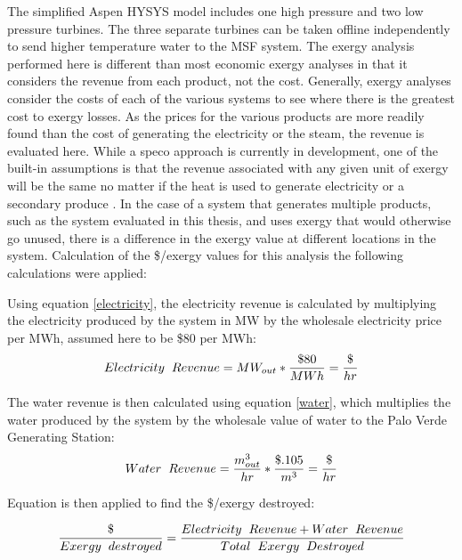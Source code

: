 The simplified Aspen HYSYS model includes one high pressure and two low pressure turbines.  The three separate turbines can be taken offline independently to send higher temperature water to the MSF system. The exergy analysis performed here is different than most economic exergy analyses in that it considers the revenue from each product, not the cost.  Generally, exergy analyses consider the costs of each of the various systems to see where there is the greatest cost to exergy losses.  As the prices for the various products are more readily found than the cost of generating the electricity or the steam, the revenue is evaluated here.  While a \ac{speco} approach is currently in development, one of the built-in assumptions is that the revenue associated with any given unit of exergy will be the same no matter if the heat is used to generate electricity or a secondary produce \cite{Paulus2006}.  In the case of a system that generates multiple products, such as the system evaluated in this thesis, and uses exergy that would otherwise go unused, there is a difference in the exergy value at different locations in the system. Calculation of the \$/exergy values for this analysis the following calculations were applied:

Using equation \ref{electricity}, the electricity revenue is calculated by multiplying the electricity produced by the system in MW by the wholesale electricity price per MWh, assumed here to be \$80 per MWh:
\begin{equation}
Electricity\hspace{.2cm} Revenue=MW_{out}*\frac{\$80}{MWh}=\frac{\$}{hr}
\label{electricity}
\end{equation}

The water revenue is then calculated using equation \ref{water}, which multiplies the water produced by the system by the wholesale value of water to the Palo Verde Generating Station:
\begin{equation}
Water\hspace{.2cm} Revenue=\frac{m^3_{out}}{hr}*\frac{\$.105}{m^3}=\frac{\$}{hr}
\label{water}
\end{equation}

Equation \cite{revenueX} is then applied to find the \$/exergy destroyed:

\begin{equation}
\frac{\$}{Exergy\hspace{.2cm}destroyed}=\frac{Electricity \hspace{.2cm} Revenue+ Water \hspace{.2cm} Revenue} {Total\hspace{.2cm}Exergy\hspace{.2cm}Destroyed}
\label{revenueX}
\end{equation}

